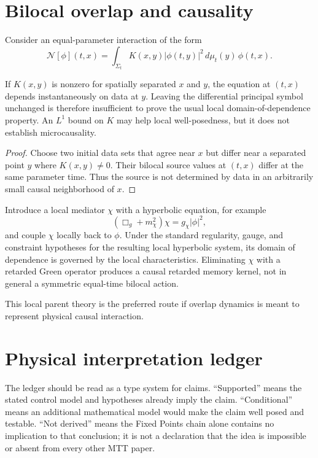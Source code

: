 \documentclass[11pt]{article}
\begin{document}
\section{Bilocal overlap and causality}

Consider an equal-parameter interaction of the form
\[
 \mathcal N[\phi](t,x)
 =\int_{\Sigma_t}K(x,y)|\phi(t,y)|^2\,d\mu_t(y)\,\phi(t,x).
\]

\begin{proposition}\label{prop:bilocal}
If $K(x,y)$ is nonzero for spatially separated $x$ and $y$, the equation at
$(t,x)$ depends instantaneously on data at $y$. Leaving the differential
principal symbol unchanged is therefore insufficient to prove the usual
local domain-of-dependence property. An $L^1$ bound on $K$ may help local
well-posedness, but it does not establish microcausality.
\end{proposition}

\begin{proof}
Choose two initial data sets that agree near $x$ but differ near a separated
point $y$ where $K(x,y)\ne0$. Their bilocal source values at $(t,x)$ differ at
the same parameter time. Thus the source is not determined by data in an
arbitrarily small causal neighborhood of $x$.
\end{proof}

\begin{proposition}\label{prop:mediator}
Introduce a local mediator $\chi$ with a hyperbolic equation, for example
\[
 (\Box_g+m_\chi^2)\chi=g_\chi|\phi|^2,
\]
and couple $\chi$ locally back to $\phi$. Under the standard regularity,
gauge, and constraint hypotheses for the resulting local hyperbolic system,
its domain of dependence is governed by the local characteristics. Eliminating
$\chi$ with a retarded Green operator produces a causal retarded memory
kernel, not in general a symmetric equal-time bilocal action.
\end{proposition}

This local parent theory is the preferred route if overlap dynamics is meant
to represent physical causal interaction.

\section{Physical interpretation ledger}

The ledger should be read as a type system for claims.  ``Supported'' means
the stated control model and hypotheses already imply the claim.
``Conditional'' means an additional mathematical model would make the claim
well posed and testable.  ``Not derived'' means the Fixed Points chain alone
contains no implication to that conclusion; it is not a declaration that the
idea is impossible or absent from every other MTT paper.
\end{document}
